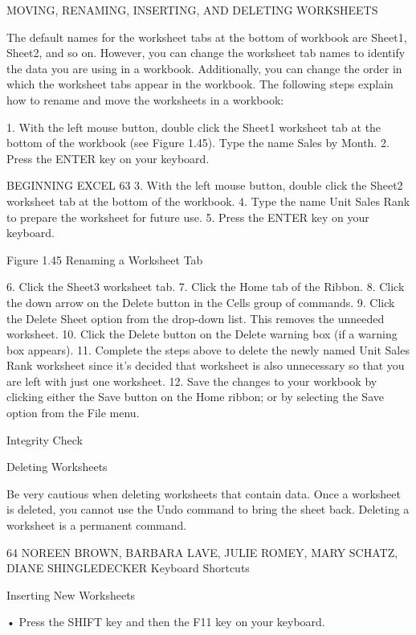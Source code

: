 MOVING, RENAMING, INSERTING, AND DELETING WORKSHEETS

The default names for the worksheet tabs at the bottom of workbook are Sheet1, Sheet2, and so on.
However, you can change the worksheet tab names to identify the data you are using in a workbook.
Additionally, you can change the order in which the worksheet tabs appear in the workbook. The
following steps explain how to rename and move the worksheets in a workbook:

1. With the left mouse button, double click the Sheet1 worksheet tab at the bottom of the
workbook (see Figure 1.45). Type the name Sales by Month.
2. Press the ENTER key on your keyboard.

BEGINNING EXCEL 63
3. With the left mouse button, double click the Sheet2 worksheet tab at the bottom of the
workbook.
4. Type the name Unit Sales Rank to prepare the worksheet for future use.
5. Press the ENTER key on your keyboard.




Figure 1.45 Renaming a Worksheet Tab




6. Click the Sheet3 worksheet tab.
7. Click the Home tab of the Ribbon.
8. Click the down arrow on the Delete button in the Cells group of commands.
9. Click the Delete Sheet option from the drop-down list. This removes the unneeded worksheet.
10. Click the Delete button on the Delete warning box (if a warning box appears).
11. Complete the steps above to delete the newly named Unit Sales Rank worksheet since it’s
decided that worksheet is also unnecessary so that you are left with just one worksheet.
12. Save the changes to your workbook by clicking either the Save button on the Home ribbon; or
by selecting the Save option from the File menu.




Integrity Check

Deleting Worksheets

Be very cautious when deleting worksheets that contain data. Once a worksheet is deleted, you cannot use the
Undo command to bring the sheet back. Deleting a worksheet is a permanent command.




64 NOREEN BROWN, BARBARA LAVE, JULIE ROMEY, MARY SCHATZ, DIANE SHINGLEDECKER
Keyboard Shortcuts


Inserting New Worksheets

• Press the SHIFT key and then the F11 key on your keyboard.



